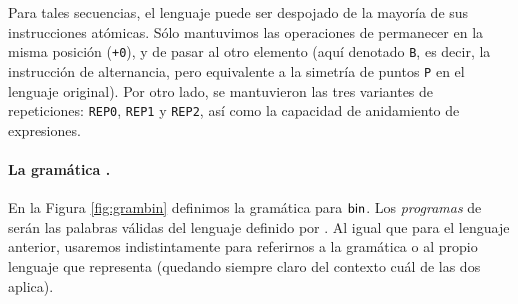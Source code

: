 Para tales secuencias, el lenguaje puede ser despojado de la mayoría de sus instrucciones atómicas. Sólo mantuvimos las operaciones de permanecer en la misma posición (\verb#+0#), y de pasar al otro elemento (aquí denotado \verb#B#, es decir, la instrucción de alternancia, pero equivalente a la simetría de puntos \verb#P# en el lenguaje original). Por otro lado, se mantuvieron las tres variantes de repeticiones: \verb#REP0#, \verb#REP1# y \verb#REP2#, así como la capacidad de anidamiento de expresiones. 

\paragraph{La gramática \grambin.}
En la Figura \ref{fig:grambin} definimos la gramática para ${\sf bin}$. Los {\em programas} de \grambin serán las palabras válidas del lenguaje definido por \grambin. Al igual que para el lenguaje anterior, usaremos indistintamente \grambin para referirnos a la gramática o al propio lenguaje que representa (quedando siempre claro del contexto cuál de las dos aplica).


